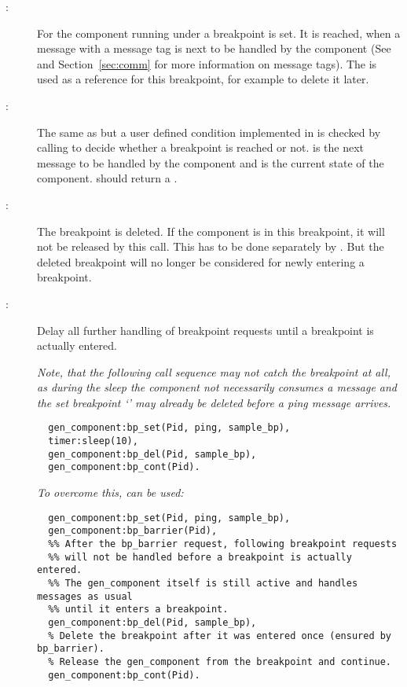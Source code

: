 \begin{description}
\item[:] For the
  component running under  a breakpoint  is set. It
  is reached, when a message with a message tag  is next to be
  handled by the component (See  and
  Section~\ref{sec:comm} for more information on message tags). The
   is used as a reference for this breakpoint, for example to
  delete it later.
\item[:]
  The same as  but a user defined
  condition implemented in  is
  checked by calling  to decide
  whether a breakpoint is reached or not.  is the next message
  to be handled by the component and  is the current state of
  the component.  should return a .
\item[:] The breakpoint
   is deleted. If the component is in this breakpoint, it will
  not be released by this call. This has to be done separately by
  . But the deleted breakpoint will no
  longer be considered for newly entering a breakpoint.
\item[:]
  Delay all further handling of breakpoint requests until a breakpoint is
  actually entered.

  \emph{Note, that the following call sequence may not catch the breakpoint at
  all, as during the sleep the component not necessarily consumes a
   message and the set breakpoint `' may already
  be deleted before a ping message arrives.}

  \begin{lstlisting}
  gen_component:bp_set(Pid, ping, sample_bp),
  timer:sleep(10),
  gen_component:bp_del(Pid, sample_bp),
  gen_component:bp_cont(Pid).
  \end{lstlisting}

  \emph{To overcome this,  can be used:}

  \begin{lstlisting}
  gen_component:bp_set(Pid, ping, sample_bp),
  gen_component:bp_barrier(Pid),
  %% After the bp_barrier request, following breakpoint requests
  %% will not be handled before a breakpoint is actually entered.
  %% The gen_component itself is still active and handles messages as usual
  %% until it enters a breakpoint.
  gen_component:bp_del(Pid, sample_bp),
  % Delete the breakpoint after it was entered once (ensured by bp_barrier).
  % Release the gen_component from the breakpoint and continue.
  gen_component:bp_cont(Pid).
  \end{lstlisting}
\end{description}

